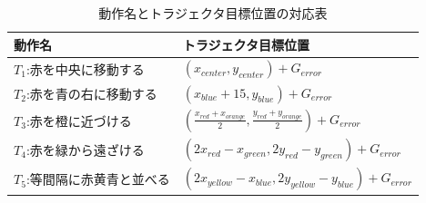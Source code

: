 \begin{table}[h]
	\caption{動作名とトラジェクタ目標位置の対応表}
	\label{table:taskname_15}
  	\begin{tabular}{|l|l|} \hline
    	動作名 & トラジェクタ目標位置\\ \hline
   	$T_{1}$:赤を中央に移動する & 
	$
    	\left( x_{center} , y_{center} \right)+G_{error}
    	$
    	\\
    	$T_{2}$:赤を青の右に移動する & 
	$
    	\left( x_{blue}+15 , y_{blue} \right)+G_{error}
    	$
    	\\
    	$T_{3}$:赤を橙に近づける & 
	$
    	\left( \frac{x_{red}+x_{orange}}{2} , \frac{y_{red}+y_{orange}}{2} \right)+G_{error}
    	$
    	\\
    	$T_{4}$:赤を緑から遠ざける & 
	$
    	\left( 2x_{red}-x_{green} , 2y_{red}-y_{green} \right)+G_{error}
    	$
    	\\
    	$T_{5}$:等間隔に赤黄青と並べる & 
	$
    	\left( 2x_{yellow}-x_{blue} , 2y_{yellow}-y_{blue} \right)+G_{error}
    	$
    	\\

\end{tabular}
\end{table}
